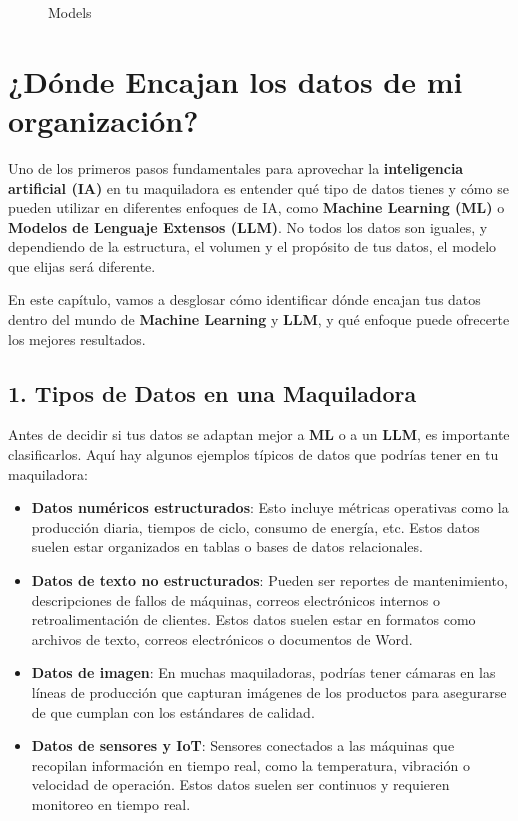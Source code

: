 \documentclass[
  10pt,
  letterpaper,
]{book}
\begin{document}
\begin{enumerate}
\begin{itemize}
\begin{figure}[H]
{    }

    \caption{Models}

    \end{figure}%
  \end{itemize}
\end{enumerate}

\section{¿Dónde Encajan los datos de mi
organización?}\label{duxf3nde-encajan-los-datos-de-mi-organizaciuxf3n}

Uno de los primeros pasos fundamentales para aprovechar la
\textbf{inteligencia artificial (IA)} en tu maquiladora es entender qué
tipo de datos tienes y cómo se pueden utilizar en diferentes enfoques de
IA, como \textbf{Machine Learning (ML)} o \textbf{Modelos de Lenguaje
Extensos (LLM)}. No todos los datos son iguales, y dependiendo de la
estructura, el volumen y el propósito de tus datos, el modelo que elijas
será diferente.

En este capítulo, vamos a desglosar cómo identificar dónde encajan tus
datos dentro del mundo de \textbf{Machine Learning} y \textbf{LLM}, y
qué enfoque puede ofrecerte los mejores resultados.

\subsection{\texorpdfstring{1. \textbf{Tipos de Datos en una
Maquiladora}}{1. Tipos de Datos en una Maquiladora}}\label{tipos-de-datos-en-una-maquiladora}

Antes de decidir si tus datos se adaptan mejor a \textbf{ML} o a un
\textbf{LLM}, es importante clasificarlos. Aquí hay algunos ejemplos
típicos de datos que podrías tener en tu maquiladora:

\begin{itemize}
\item
  \textbf{Datos numéricos estructurados}: Esto incluye métricas
  operativas como la producción diaria, tiempos de ciclo, consumo de
  energía, etc. Estos datos suelen estar organizados en tablas o bases
  de datos relacionales.
\item
  \textbf{Datos de texto no estructurados}: Pueden ser reportes de
  mantenimiento, descripciones de fallos de máquinas, correos
  electrónicos internos o retroalimentación de clientes. Estos datos
  suelen estar en formatos como archivos de texto, correos electrónicos
  o documentos de Word.
\item
  \textbf{Datos de imagen}: En muchas maquiladoras, podrías tener
  cámaras en las líneas de producción que capturan imágenes de los
  productos para asegurarse de que cumplan con los estándares de
  calidad.
\item
  \textbf{Datos de sensores y IoT}: Sensores conectados a las máquinas
  que recopilan información en tiempo real, como la temperatura,
  vibración o velocidad de operación. Estos datos suelen ser continuos y
  requieren monitoreo en tiempo real.
\end{itemize}
\end{document}
